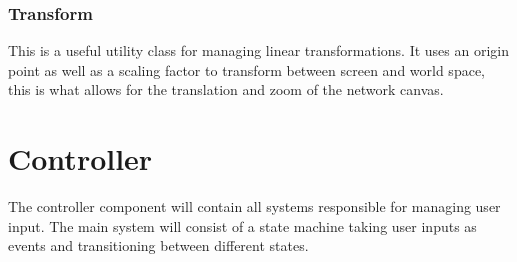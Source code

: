 
        \subsubsection{Transform}

            This is a useful utility class for managing linear transformations. It uses an origin point as well as a scaling factor to transform between screen and world space, this is what allows for the translation and zoom of the network canvas.







\section{Controller}

    The controller component will contain all systems responsible for managing user input. The main system will consist of a state machine taking user inputs as events and transitioning between different states.

